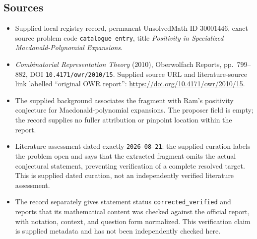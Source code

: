 \documentclass[11pt]{article}
\begin{document}
\subsection{Sources}
\begin{itemize}
\item Supplied local registry record, permanent UnsolvedMath ID \(30001446\), exact source problem code \texttt{catalogue entry}, title \emph{Positivity in Specialized Macdonald-Polynomial Expansions}.
\item \emph{Combinatorial Representation Theory} (2010), Oberwolfach Reports, pp.~799--882, DOI \texttt{10.4171/owr/2010/15}. Supplied source URL and literature-source link labelled ``original OWR report'': \url{https://doi.org/10.4171/owr/2010/15}.
\item The supplied background associates the fragment with Ram's positivity conjecture for Macdonald-polynomial expansions. The proposer field is empty; the record supplies no fuller attribution or pinpoint location within the report.
\item Literature assessment dated exactly \texttt{2026-08-21}: the supplied curation labels the problem open and says that the extracted fragment omits the actual conjectural statement, preventing verification of a complete resolved target. This is supplied dated curation, not an independently verified literature assessment.
\item The record separately gives statement status \texttt{corrected\_verified} and reports that its mathematical content was checked against the official report, with notation, context, and question form normalized. This verification claim is supplied metadata and has not been independently checked here.
\end{itemize}
\end{document}
